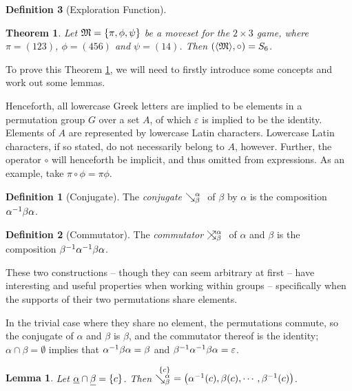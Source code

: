 \documentclass[a4paper,twoside,12pt,openany]{report}
\theoremstyle{plain}
\newtheorem{theorem}{Theorem}
\newtheorem{lemma}{Lemma}
\theoremstyle{definition}
\newtheorem{definition}{Definition}
\theoremstyle{remark}
\begin{document}
\begin{definition}[Exploration Function]
\begin{theorem}\label{t23}
	Let \(\mathfrak{M}=\left\{ \pi,\phi,\psi \right\}\) be a moveset for the \(2\times 3\) game, where \(\pi=(123)\), \(\phi=(456)\) and \(\psi=(14)\). Then \(\left(\langle\mathfrak{M}\rangle,\circ\right)=S_6\).
\end{theorem}

To prove this Theorem \ref{t23}, we will need to firstly introduce some concepts and work out some lemmas.

Henceforth, all lowercase Greek letters are implied to be elements in a permutation group \(G\) over a set \(A\), of which \(\varepsilon\) is implied to be the identity.
Elements of \(A\) are represented by lowercase Latin characters. Lowercase Latin characters, if so stated, do not necessarily belong to \(A\), however.
Further, the operator \(\circ\) will henceforth be implicit, and thus omitted from expressions. As an example, take \(\pi\circ\phi=\pi\phi\).

\begin{definition}[Conjugate]
	The \emph{conjugate} \(\searrow^{\alpha}_{\beta}\ \) of \(\beta\) by \(\alpha\) is the composition \(\alpha^{-1}\beta\alpha\).
\end{definition}

\begin{definition}[Commutator]
	The \emph{commutator} \(\nearrow\kern-1em\searrow^\alpha_\beta\ \) of \(\alpha\) and \(\beta\) is the composition \(\beta^{-1}\alpha^{-1}\beta\alpha\).
\end{definition}

These two constructions -- though they can seem arbitrary at first -- have interesting and useful properties when working within groups -- specifically when the supports of their two permutations share elements.

In the trivial case where they share no element, the permutations commute, so the conjugate of \(\alpha\) and \(\beta\) is \(\beta\), and the commutator thereof is the identity;
\(\alpha \cap \beta = \emptyset\) implies that \(\alpha^{-1} \beta\alpha=\beta \) and \(\beta^{-1} \alpha^{-1} \beta\alpha = \varepsilon\).

\begin{lemma}\label{lmconj}
	Let 
	\(\underline{\alpha}\cap\underline{\beta}=\{c\}\). 
	Then \(\overset{\left\{ c \right\}}{\searrow^{\alpha}_{\beta}\ } = \left( \alpha^{-1}(c),\beta(c),\cdots,\beta^{-1}(c) \right)\).
\end{lemma}


\end{definition}
\end{document}
